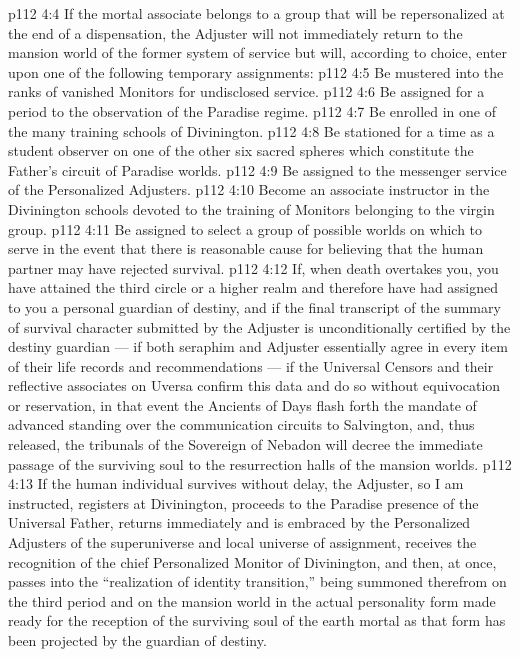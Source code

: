 \vs p112 4:4 If the mortal associate belongs to a group that will be repersonalized at the end of a dispensation, the Adjuster will not immediately return to the mansion world of the former system of service but will, according to choice, enter upon one of the following temporary assignments:
\vs p112 4:5 \bibnobreakspace Be mustered into the ranks of vanished Monitors for undisclosed service.
\vs p112 4:6 \bibnobreakspace Be assigned for a period to the observation of the Paradise regime.
\vs p112 4:7 \bibnobreakspace Be enrolled in one of the many training schools of Divinington.
\vs p112 4:8 \bibnobreakspace Be stationed for a time as a student observer on one of the other six sacred spheres which constitute the Father’s circuit of Paradise worlds.
\vs p112 4:9 \bibnobreakspace Be assigned to the messenger service of the Personalized Adjusters.
\vs p112 4:10 \bibnobreakspace Become an associate instructor in the Divinington schools devoted to the training of Monitors belonging to the virgin group.
\vs p112 4:11 \bibnobreakspace Be assigned to select a group of possible worlds on which to serve in the event that there is reasonable cause for believing that the human partner may have rejected survival.
\vs p112 4:12 \pc If, when death overtakes you, you have attained the third circle or a higher realm and therefore have had assigned to you a personal guardian of destiny, and if the final transcript of the summary of survival character submitted by the Adjuster is unconditionally certified by the destiny guardian --- if both seraphim and Adjuster essentially agree in every item of their life records and recommendations --- if the Universal Censors and their reflective associates on Uversa confirm this data and do so without equivocation or reservation, in that event the Ancients of Days flash forth the mandate of advanced standing over the communication circuits to Salvington, and, thus released, the tribunals of the Sovereign of Nebadon will decree the immediate passage of the surviving soul to the resurrection halls of the mansion worlds.
\vs p112 4:13 If the human individual survives without delay, the Adjuster, so I am instructed, registers at Divinington, proceeds to the Paradise presence of the Universal Father, returns immediately and is embraced by the Personalized Adjusters of the superuniverse and local universe of assignment, receives the recognition of the chief Personalized Monitor of Divinington, and then, at once, passes into the “realization of identity transition,” being summoned therefrom on the third period and on the mansion world in the actual personality form made ready for the reception of the surviving soul of the earth mortal as that form has been projected by the guardian of destiny.
